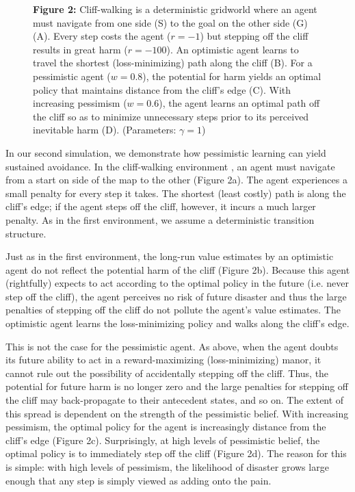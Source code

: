 \documentclass[11pt]{article} %
\begin{document}
\begin{figure}
  \centerline{%
  }
  \par \textbf{Figure 2:} Cliff-walking is a deterministic gridworld where an agent must navigate from one side (S) to the goal on the other side (G) (A). Every step costs the agent ($r=-1$) but stepping off the cliff results in great harm ($r=-100$). An optimistic agent learns to travel the shortest (loss-minimizing) path along the cliff (B). For a pessimistic agent ($w=0.8$), the potential for harm yields an optimal policy that maintains distance from the cliff's edge (C). With increasing pessimism ($w=0.6$), the agent learns an optimal path off the cliff so as to minimize unnecessary steps prior to its perceived inevitable harm (D). (Parameters: $\gamma = 1$)
\end{figure}

In our second simulation, we demonstrate how pessimistic learning can yield sustained avoidance. In the cliff-walking environment \citep{SuttonBarto1998, SuttonBarto2018, Gaskett2003}, an agent must navigate from a start on side of the map to the other (Figure 2a). The agent experiences a small penalty for every step it takes. The shortest (least costly) path is along the cliff's edge; if the agent steps off the cliff, however, it incurs a much larger penalty. As in the first environment, we assume a deterministic transition structure.

Just as in the first environment, the long-run value estimates by an optimistic agent do not reflect the potential harm of the cliff (Figure 2b). Because this agent (rightfully) expects to act according to the optimal policy in the future (i.e. never step off the cliff), the agent perceives no risk of future disaster and thus the large penalties of stepping off the cliff do not pollute the agent's value estimates. The optimistic agent learns the loss-minimizing policy and walks along the cliff's edge.

This is not the case for the pessimistic agent. As above, when the agent doubts its future ability to act in a reward-maximizing (loss-minimizing) manor, it cannot rule out the possibility of accidentally stepping off the cliff. Thus, the potential for future harm is no longer zero and the large penalties for stepping off the cliff may back-propagate to their antecedent states, and so on. The extent of this spread is dependent on the strength of the pessimistic belief. With increasing pessimism, the optimal policy for the agent is increasingly distance from the cliff's edge (Figure 2c). Surprisingly, at high levels of pessimistic belief, the optimal policy is to immediately step off the cliff (Figure 2d). The reason for this is simple: with high levels of pessimism, the likelihood of disaster grows large enough that any step is simply viewed as adding onto the pain.
\end{document}
